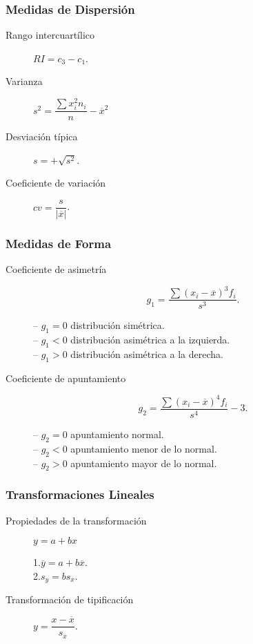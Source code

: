 \documentclass[a4paper,dvips]{article}
\newlength{\mylength}
\newenvironment{marco}{
	\setlength{\fboxsep}{5pt}
	\setlength{\mylength}{\textwidth}
	\addtolength{\mylength}{-2\fboxsep}
	\addtolength{\mylength}{-2\fboxrule}
	\noindent
	\begin{Sbox}
	\begin{minipage}{\mylength}
	\setlength{\abovedisplayskip}{3pt}
	\setlength{\belowdisplayskip}{3pt}
}
{
	\end{minipage}
	\end{Sbox}
	\fbox{\TheSbox}
}
\begin{document}
\begin{marco}
\begin{multicols}{2}
\subsubsection*{Medidas de Dispersión}
\begin{description}
\item [Rango intercuartílico] $RI=c_3-c_1$.
\item [Varianza] $s^2=\dfrac{\sum x_i^2n_i}{n}-\overline{x}^2$
\item [Desviación típica] $s=+\sqrt{s^2}$.
\item [Coeficiente de variación] $cv=\dfrac{s}{|\overline{x}|}$.
\end{description}
\subsubsection*{Medidas de Forma}
\begin{description}
\item [Coeficiente de asimetría] \[g_1=\frac{\sum
(x_i-\overline{x})^3f_i}{s^3}.\]

-- $g_1=0$ distribución simétrica.\\
-- $g_1<0$ distribución asimétrica a la izquierda.\\
-- $g_1>0$ distribución asimétrica a la derecha.
\item [Coeficiente de apuntamiento] \[g_2=\frac{\sum
(x_i-\overline{x})^4f_i}{s^4}-3.\]

-- $g_2=0$ apuntamiento normal.\\
-- $g_2<0$ apuntamiento menor de lo normal.\\
-- $g_2>0$ apuntamiento mayor de lo normal.
\end{description}
\subsubsection*{Transformaciones Lineales}
\begin{description}
\item [Propiedades de la transformación]\mbox{$y=a+bx$}

1.\quad $\overline{y}=a+b\overline{x}$.\\
2.\quad $s_y=bs_x$.

\item [Transformación de tipificación] $y=\dfrac{x-\overline{x}}{s_x}$.
\end{description}
\end{multicols}
\end{marco}
\end{document}
